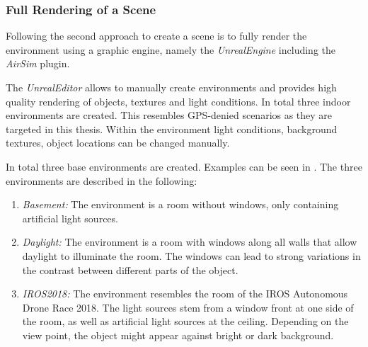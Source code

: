 \subsubsection{Full Rendering of a Scene}

Following \cite{Ros2016, Gaidon2016, Johnson-Roberson2016, Tobin2017, Tremblay2018a} the second approach to create a scene is to fully render the environment using a graphic engine, namely the \textit{UnrealEngine} including the \textit{AirSim} plugin.

The \textit{UnrealEditor} allows to manually create environments and provides high quality rendering of objects, textures and light conditions. In total three indoor environments are created. This resembles \ac{GPS}-denied scenarios as they are targeted in this thesis. Within the environment light conditions, background textures, object locations can be changed manually.

In total three base environments are created. Examples can be seen in . The three environments are described in the following:
\begin{enumerate}
	\item \textit{Basement:} The environment is a room without windows, only containing artificial light sources. 
	\item \textit{Daylight:} The environment is a room with windows along all walls that allow daylight to illuminate the room. The windows can lead to strong variations in the contrast between different parts of the object.
	\item \textit{IROS2018:} The environment resembles the room of the \ac{IROS} Autonomous Drone Race 2018. The light sources stem from a window front at one side of the room, as well as artificial light sources at the ceiling. Depending on the view point, the object might appear against bright or dark background.
\end{enumerate}

